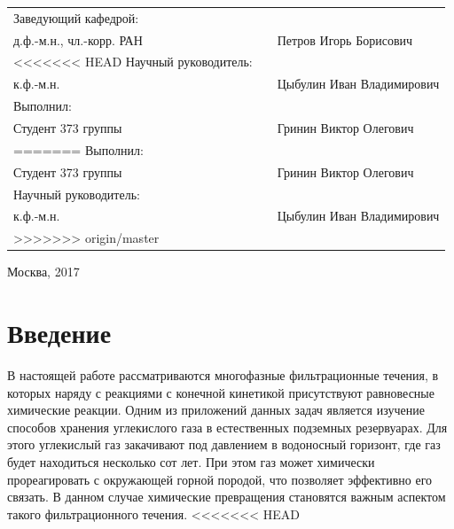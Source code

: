 \documentclass[14pt,a4paper]{extarticle}
\begin{document}
\begin{flushleft}
	\begin{tabularx}{\textwidth}{lcl}
		Заведующий кафедрой: \\
		д.ф.-м.н., чл.-корр. РАН  & \raisebox{-3pt}{\rule{4cm}{0.5pt}} & Петров Игорь Борисович \\[5mm]
	
<<<<<<< HEAD
		Научный руководитель:\\
		к.ф.-м.н. & \raisebox{-3pt}{\rule{4cm}{0.5pt}} & Цыбулин Иван Владимирович \\[5mm]	
	
		Выполнил: \\
		Студент 373 группы  & \raisebox{-3pt}{\rule{4cm}{0.5pt}} & Гринин Виктор Олегович \\[5mm]
		
=======
		Выполнил: \\
		Студент 373 группы  & \raisebox{-3pt}{\rule{4cm}{0.5pt}} & Гринин Виктор Олегович \\[5mm]
		
		Научный руководитель:\\
		к.ф.-м.н. & \raisebox{-3pt}{\rule{4cm}{0.5pt}} & Цыбулин Иван Владимирович \\[5mm]
>>>>>>> origin/master
	\end{tabularx}
\end{flushleft}

\vfill

\begin{center}
	Москва, 2017
\end{center}

\onehalfspacing

\restoregeometry

\clearpage
\tableofcontents
\clearpage

\section*{Введение}

В настоящей работе рассматриваются многофазные фильтрационные течения, в которых наряду с реакциями с конечной кинетикой присутствуют равновесные химические реакции. Одним из приложений данных задач является изучение способов хранения углекислого газа в естественных подземных резервуарах. Для этого углекислый газ закачивают под давлением в водоносный горизонт, где газ будет находиться несколько сот лет. При этом газ может химически прореагировать с окружающей горной породой, что позволяет эффективно его связать. В данном случае химические превращения становятся важным аспектом такого фильтрационного течения.
<<<<<<< HEAD
\end{document}
